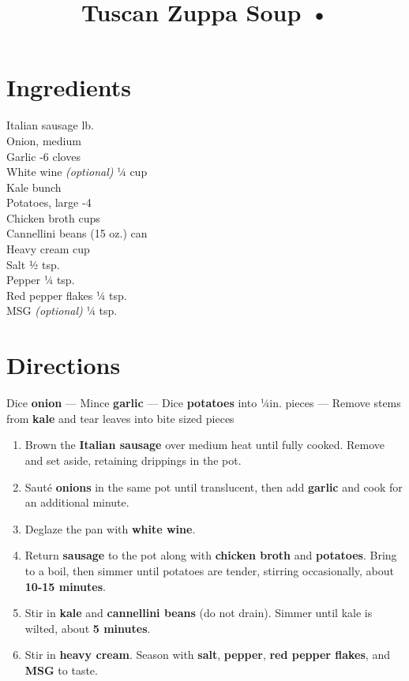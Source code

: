 \documentclass[11pt,letterpaper]{article}
\title{Tuscan Zuppa Soup •}
\author{}
\date{}
\begin{document}
\maketitle
\thispagestyle{empty}

\section*{Ingredients}
\setlength{\columnsep}{20pt}
\begin{multicols}{2}
\noindent
    Italian sausage  lb. \\
    Onion, medium  \\
    Garlic -6 cloves \\
    White wine \textit{(optional)} \dotfill ¼ cup \\
    Kale  bunch \\
    Potatoes, large -4 \\
    \columnbreak
    Chicken broth  cups \\
    Cannellini beans  (15 oz.) can \\
    Heavy cream  cup \\
    Salt \dotfill ½ tsp.\\
    Pepper \dotfill ¼ tsp. \\
	Red pepper flakes \dotfill ¼ tsp. \\
    MSG \textit{(optional)} \dotfill ¼ tsp.
\end{multicols}

\section*{Directions}

\noindent
Dice \textbf{onion} ---
Mince \textbf{garlic} ---
Dice \textbf{potatoes} into ¼in. pieces ---
Remove stems from \textbf{kale} and tear leaves into bite sized pieces

\begin{enumerate}
    \item Brown the \textbf{Italian sausage} over medium heat until fully cooked. Remove and set aside, retaining drippings in the pot.
    \item Sauté \textbf{onions} in the same pot until translucent, then add \textbf{garlic} and cook for an additional minute.
    \item Deglaze the pan with \textbf{white wine}.
    \item Return \textbf{sausage} to the pot along with \textbf{chicken broth} and \textbf{potatoes}. Bring to a boil, then simmer until potatoes are tender, stirring occasionally, about \textbf{10-15 minutes}.
    \item Stir in \textbf{kale} and \textbf{cannellini beans} (do not drain). Simmer until kale is wilted, about \textbf{5 minutes}.
    \item Stir in \textbf{heavy cream}. Season with \textbf{salt}, \textbf{pepper}, \textbf{red pepper flakes}, and \textbf{MSG} to taste.
\end{enumerate}
\end{document}
